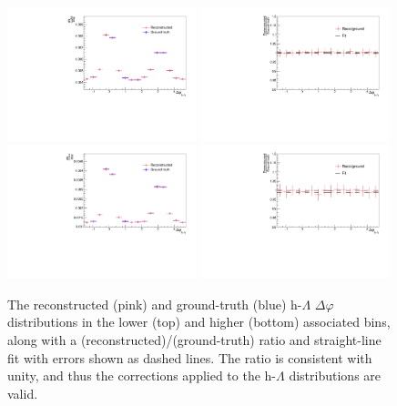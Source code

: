 \begin{figure}[ht]
    \centering
    \includegraphics[width=0.49\textwidth]{figures/analysis/h_lambda_dphi_closure_lowpt.pdf}
    \includegraphics[width=0.49\textwidth]{figures/analysis/h_lambda_dphi_closure_ratio_lowpt.pdf}
    \includegraphics[width=0.49\textwidth]{figures/analysis/h_lambda_dphi_closure_highpt.pdf}
    \includegraphics[width=0.49\textwidth]{figures/analysis/h_lambda_dphi_closure_ratio_highpt.pdf}
    \caption{The reconstructed (pink) and ground-truth (blue) h-$\Lambda$ $\Delta\varphi$ distributions in the lower (top) and higher (bottom) associated \pt bins, along with a (reconstructed)/(ground-truth) ratio and straight-line fit with errors shown as dashed lines. The ratio is consistent with unity, and thus the corrections applied to the h-$\Lambda$ distributions are valid.}
    \label{fig:h_lambda_closure}
\end{figure}

